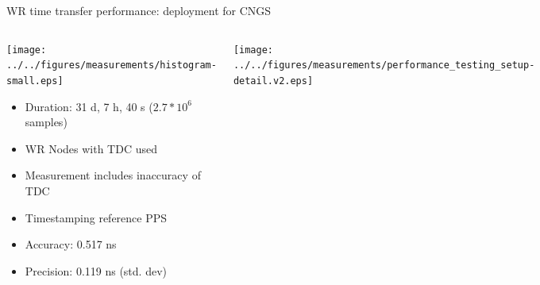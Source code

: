 \documentclass[compress,red]{beamer}
\begin{document}
\begin{frame}{WR time transfer performance: deployment for CNGS}

  \begin{columns}[c]
	  \begin{center}

		\hspace{-1cm}
		\texttt{[image: ../../figures/measurements/histogram-small.eps]}
		\begin{itemize}
		       \item Duration: 31 d, 7 h, 40 s ($2.7*10^6$ samples)
		       \item WR Nodes with TDC used
		       \item Measurement includes inaccuracy of TDC
		       \item Timestamping reference PPS
		       	\item Accuracy: 0.517 ns
			\item Precision: 0.119 ns (std. dev)
		\end{itemize}			


	  \end{center}
		\begin{center}
		\texttt{[image: ../../figures/measurements/performance\_testing\_setup-detail.v2.eps]}
		\end{center}
  \end{columns}
\end{frame}
\end{document}
